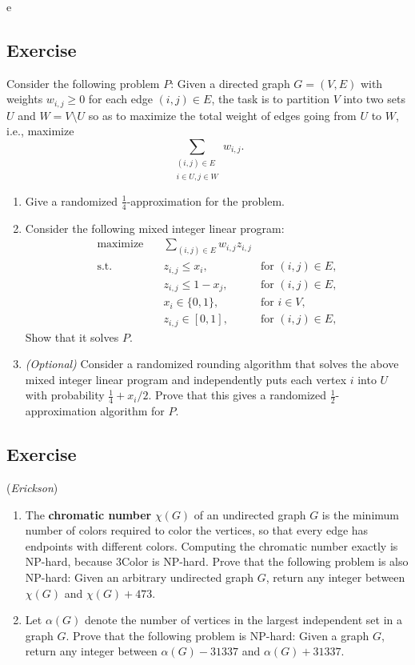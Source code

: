 \documentclass[14pt]{extreport}
\newcounter{counter}
\newcommand{\Exercise}{Exercise \stepcounter{counter}\thecounter}
\begin{document}
e\subsection*{\Exercise}
    Consider the following problem \( P \): Given a directed graph \( G = (V, E) \) with weights \( w_{i,j} \geq 0 \) for each edge \( (i, j) \in E \), the task is to partition \( V \) into two sets \( U \) and \( W = V \setminus U \) so as to maximize the total weight of edges going from \( U \) to \( W \), i.e., maximize
    \[
    \sum_{\substack{(i,j) \in E \\ i \in U,j \in W}} w_{i,j}.
    \]
    
    \begin{enumerate}
        \item Give a randomized \(\frac{1}{4}\)-approximation for the problem.
        
        \item Consider the following mixed integer linear program:
        \begin{align*}
        \text{maximize} \quad & \sum_{(i,j) \in E} w_{i,j}z_{i,j} \\
        \text{s.t.} \quad & z_{i,j} \leq x_i, & \text{for } (i, j) \in E, \\
        & z_{i,j} \leq 1 - x_j, & \text{for } (i, j) \in E, \\
        & x_i \in \{0, 1\}, & \text{for } i \in V, \\
        & z_{i,j} \in [0, 1], & \text{for } (i, j) \in E,
        \end{align*}
        Show that it solves \( P \).
        \item \textit{(Optional)} Consider a randomized rounding algorithm that solves the above mixed integer linear program and independently puts each vertex \( i \) into \( U \) with probability \(\frac{1}{4}+x_i/2\). Prove that this gives a randomized \( \frac{1}{2} \)-approximation algorithm for \( P \).
    \end{enumerate}

\subsection*{\Exercise}
    (\textit{Erickson})
    \begin{enumerate}
        \item The \textbf{chromatic number} $\chi(G)$ of an undirected graph $G$ is the minimum number of colors required to color the vertices, so that every edge has endpoints with different colors. Computing the chromatic number exactly is \textsf{NP-hard}, because \textsf{3Color} is \textsf{NP-hard}. Prove that the following problem is also \textsf{NP-hard}: Given an arbitrary undirected graph $G$, return any integer between $\chi(G)$ and $\chi(G) + 473$.
        \item Let $\alpha(G)$ denote the number of vertices in the largest independent set in a graph $G$. Prove that the following problem is \textsf{NP-hard}: Given a graph $G$, return any integer between $\alpha(G) - 31337$ and $\alpha(G) + 31337$.
    \end{enumerate}
\end{document}

